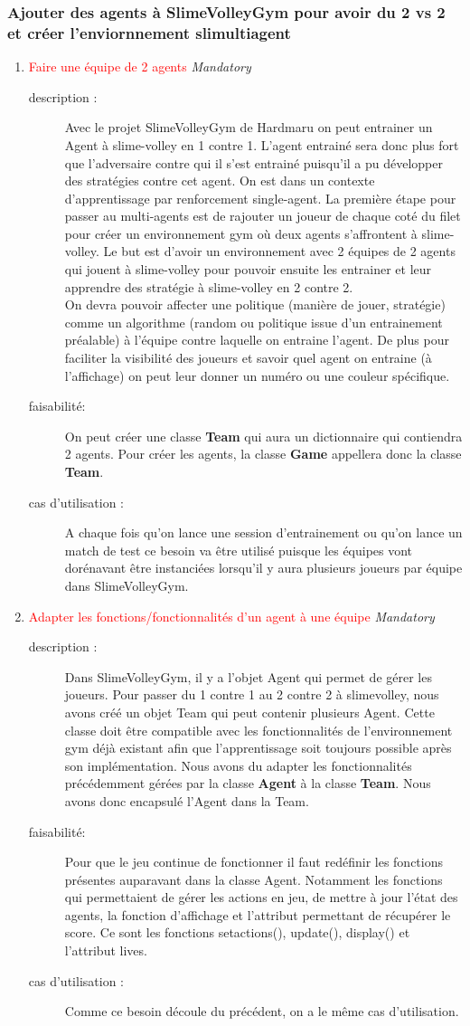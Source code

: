 \documentclass[11pt, a4paper]{article}
\newcommand{\besoinVItem}[4]{
	\item #1
	\begin{description}
		\item[description :]
		#2
		\item[faisabilité: ]
		#3
		\item[cas d'utilisation :]
		#4
	\end{description}
}
\begin{document}
	\subsubsection{Ajouter des agents à SlimeVolleyGym pour avoir du 2 vs 2 et créer l'enviornnement slimultiagent}
	\begin{enumerate}
		\besoinVItem{\textcolor{red}{Faire une équipe de 2 agents}    \textit{Mandatory}}
		{
			Avec le projet SlimeVolleyGym de Hardmaru on peut entrainer un Agent à slime-volley en 1 contre 1. L'agent entrainé sera donc plus fort que l'adversaire contre qui il s'est entrainé puisqu'il a pu développer des stratégies contre cet agent. On est dans un contexte d'apprentissage par renforcement single-agent. La première étape pour passer au multi-agents est de rajouter un joueur de chaque coté du filet pour créer un environnement gym où deux agents s'affrontent à slime-volley. Le but est d'avoir un environnement avec 2 équipes de 2 agents qui jouent à slime-volley pour pouvoir ensuite les entrainer et leur apprendre des stratégie à slime-volley en 2 contre 2. \\
			On devra pouvoir affecter une politique (manière de jouer, stratégie) comme un algorithme (random ou politique issue d'un entrainement préalable) à l'équipe contre laquelle on entraine l'agent. De plus pour faciliter la visibilité des joueurs et savoir quel agent on entraine (à l'affichage) on peut leur donner un numéro ou une couleur spécifique.
		}
		{
			On peut créer une classe \textbf{Team} qui aura un dictionnaire qui contiendra 2 agents. Pour créer les agents, la classe \textbf{Game}  appellera donc la classe \textbf{Team}.
		}
		{
			A chaque fois qu'on lance une session d'entrainement ou qu'on lance un match de test ce besoin va être utilisé puisque les équipes vont dorénavant être instanciées lorsqu'il y aura plusieurs joueurs par équipe dans SlimeVolleyGym.
		}




		\besoinVItem{\textcolor{red}{Adapter les fonctions/fonctionnalités d'un agent à une équipe} \textit{Mandatory}}
		{
			Dans SlimeVolleyGym, il y a l'objet Agent qui permet de gérer les joueurs. Pour passer du 1 contre 1 au 2 contre 2 à slimevolley, nous avons créé un objet Team qui peut contenir plusieurs Agent. Cette classe doit être compatible avec les fonctionnalités de l'environnement gym déjà existant afin que l'apprentissage soit toujours possible après son implémentation. Nous avons  du adapter les fonctionnalités précédemment gérées par la classe \textbf{Agent} à la classe \textbf{Team}. Nous avons donc encapsulé l'Agent dans la Team.
		}
		{
			Pour que le jeu continue de fonctionner il faut redéfinir les fonctions  présentes auparavant dans la classe Agent. Notamment les fonctions qui permettaient de gérer les actions en jeu, de mettre à jour l'état des agents, la fonction d'affichage et l'attribut permettant de récupérer le score.
		Ce sont les fonctions setactions(), update(), display() et l'attribut lives.
		}
		{
			Comme ce besoin découle du précédent, on a le même cas d'utilisation.
		}




\end{enumerate}
\end{document}
